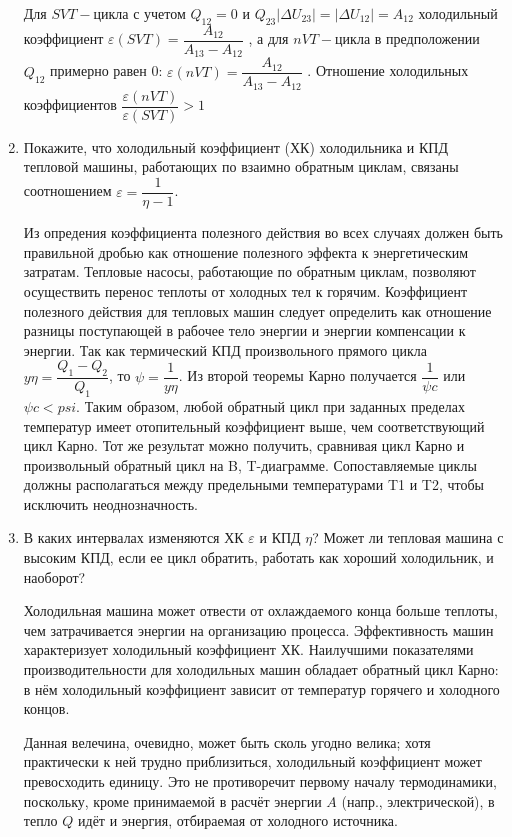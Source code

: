 \documentclass[12pt,a4paper]{article}%
\begin{document}
\begin{enumerate}
	Для $SVT-$цикла с учетом $Q_{12}=0$ и $Q_{23}|\Delta U_{23}|=|\Delta U_{12}|= A_{12}$ холодильный коэффициент $ \varepsilon (SVT) = \dfrac{A_{12}}{A_{13} - A_{12}} $ , а для $nVT-$цикла в предположении $Q_{12}$ примерно равен 0: $ \varepsilon (nVT) = \dfrac{A_{12}}{A_{13} - A_{12}} $ . Отношение холодильных коэффициентов $ \dfrac{\varepsilon(nVT)}{\varepsilon (SVT)} > 1 $
	
	\item Покажите, что холодильный коэффициент (ХК)  холодильника и КПД тепловой машины, работающих по взаимно обратным циклам, связаны соотношением $ \varepsilon = \dfrac{1}{\eta-1}$.
	
	Из опредения коэффициента полезного действия во всех случаях должен быть правильной дробью как отношение полезного эффекта к энергетическим затратам. Тепловые насосы, работающие по обратным циклам, позволяют осуществить перенос теплоты от холодных тел к горячим. Коэффициент полезного действия для тепловых машин следует определить как отношение разницы поступающей в рабочее тело энергии и энергии компенсации к энергии. Так как термический КПД произвольного прямого цикла $ y\eta = \dfrac{Q_1 - Q_2}{Q_1} $, то $ \psi = \dfrac{1}{y\eta} $. Из второй теоремы Карно получается $ \dfrac{1}{\psi c} $ или $ \psi c < psi $. Таким образом, любой обратный цикл при заданных пределах температур имеет отопительный коэффициент выше, чем соответствующий цикл Карно. Тот же результат можно получить, сравнивая цикл Карно и произвольный обратный цикл на B, T-диаграмме. Сопоставляемые циклы должны располагаться между предельными температурами T1 и T2, чтобы исключить неоднозначность.
	
	\item В каких интервалах изменяются ХК $\varepsilon$ и КПД $ \eta $? Может ли тепловая
	машина с высоким КПД, если ее цикл обратить, работать как хороший холодильник, и наоборот?
	
	Холодильная машина может отвести от охлаждаемого конца больше теплоты, чем затрачивается энергии на организацию процесса. Эффективность машин характеризует холодильный коэффициент ХК. Наилучшими показателями производительности для холодильных машин обладает обратный цикл Карно: в нём холодильный коэффициент зависит от температур горячего и холодного концов. 
	
	Данная велечина, очевидно, может быть сколь угодно велика; хотя практически к ней трудно приблизиться, холодильный коэффициент может превосходить единицу. Это не противоречит первому началу термодинамики, поскольку, кроме принимаемой в расчёт энергии $A$ (напр., электрической), в тепло $Q$ идёт и энергия, отбираемая от холодного источника.
	

\end{enumerate}
\end{document}
